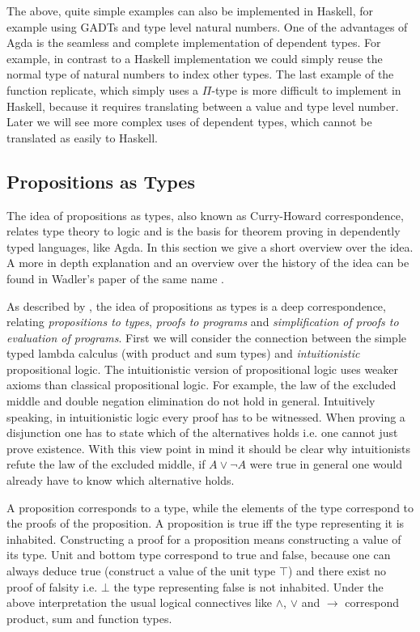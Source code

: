The above, quite simple examples can also be implemented in Haskell, for
example using GADTs and type level natural numbers.
One of the advantages of Agda is the seamless and complete implementation of
dependent types.
For example, in contrast to a Haskell implementation we could simply reuse the
normal type of natural numbers to index other types.
The last example of the function replicate, which simply uses a $\Pi$-type is
more difficult to implement in Haskell, because it requires translating between
a value and type level number.
Later we will see more complex uses of dependent types, which cannot be
translated as easily to Haskell.


\subsection{Propositions as Types}

The idea of propositions as types, also known as Curry-Howard correspondence,
relates type theory to logic and is the basis for theorem proving in
dependently typed languages, like Agda.
In this section we give a short overview over the idea.
A more in depth explanation and an overview over the history of the idea can be
found in Wadler's paper of the same name \cite{DBLP:journals/cacm/Wadler15}.

As described by \textcite{DBLP:journals/cacm/Wadler15}, the idea of propositions
as types is a deep correspondence, relating \textit{propositions to types},
\textit{proofs to programs} and \textit{simplification of proofs to evaluation
of programs}.
First we will consider the connection between the simple typed lambda calculus
(with product and sum types) and \textit{intuitionistic} propositional logic.
The intuitionistic version of propositional logic uses weaker axioms than
classical propositional logic.
For example, the law of the excluded middle and double negation elimination do
not hold in general.
Intuitively speaking, in intuitionistic logic every proof has to be witnessed.
When proving a disjunction one has to state which of the alternatives holds i.e.
one cannot just prove existence.
With this view point in mind it should be clear why intuitionists refute the law
of the excluded middle, if $A \vee \neg A$ were true in general one would
already have to know which alternative holds.

A proposition corresponds to a type, while the elements of the type correspond
to the proofs of the proposition.
A proposition is true iff the type representing it is inhabited.
Constructing a proof for a proposition means constructing a value of its type.
Unit and bottom type correspond to true and false, because one can always deduce
true (construct a value of the unit type $\top$) and there exist no proof of
falsity i.e. $\bot$ the type representing false is not inhabited.
Under the above interpretation the usual logical connectives like $\wedge$,
$\vee$ and $\rightarrow$ correspond product, sum and function types.

